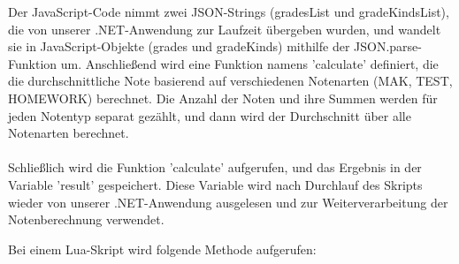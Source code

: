 Der JavaScript-Code nimmt zwei JSON-Strings (gradesList und gradeKindsList), die von unserer .NET-Anwendung 
zur Laufzeit übergeben wurden, und wandelt sie in JavaScript-Objekte (grades und gradeKinds) 
mithilfe der JSON.parse-Funktion um. Anschließend wird eine Funktion namens 'calculate' definiert, 
die die durchschnittliche Note basierend auf verschiedenen Notenarten (MAK, TEST, HOMEWORK) berechnet. 
Die Anzahl der Noten und ihre Summen werden für jeden Notentyp separat gezählt, und dann wird der 
Durchschnitt über alle Notenarten berechnet.
\\\\
Schließlich wird die Funktion 'calculate' aufgerufen, und das Ergebnis in der Variable 'result' gespeichert. 
Diese Variable wird nach Durchlauf des Skripts wieder von unserer .NET-Anwendung ausgelesen und 
zur Weiterverarbeitung der Notenberechnung verwendet.


\newpage
{}
Bei einem Lua-Skript wird folgende Methode aufgerufen:

